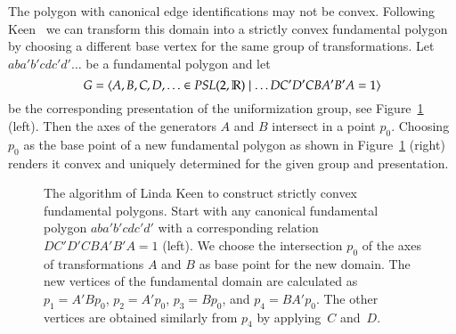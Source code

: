 \documentclass[Thesis]{subfiles}
\begin{document}


The polygon with canonical edge identifications may not be
convex. Following Keen~\cite{keen1966} we can transform this domain
into a strictly convex fundamental polygon by choosing a different
base vertex for the same group of transformations. Let
$aba'b'cdc'd'\ldots$ be a fundamental polygon and let
\begin{equation}
G=\left<A,B,C,D,\ldots\in \mathit{PSL}(2,\mathbb R)\mid \ldots DC'D'CBA'B'A =1\right>
\end{equation}
be the corresponding presentation of the uniformization group, see
Figure~\ref{fig:keen_polygon} (left). Then the axes of the generators
$A$ and $B$ intersect in a point $p_0$. Choosing $p_0$ as the base
point of a new fundamental polygon as shown in
Figure~\ref{fig:keen_polygon} (right) renders it convex and uniquely
determined for the given group and presentation.
\begin{figure}
\centering
{}
\caption{ The algorithm of Linda Keen to construct strictly convex
  fundamental polygons.  Start with any canonical fundamental polygon
  $aba'b'cdc'd'$ with a corresponding relation $DC'D'CBA'B'A=1$
  (left).  We choose the intersection $p_0$ of the axes of
  transformations $A$ and $B$ as base point for the new domain. The
  new vertices of the fundamental domain are calculated as
  $p_1=A'Bp_0$, $p_2=A'p_0$, $p_3=Bp_0$, and
  $p_4=BA'p_0$.  The other vertices are obtained similarly from $p_4$
  by applying~$C$ and~$D$.}
\label{fig:keen_polygon}
\end{figure}
\end{document}
